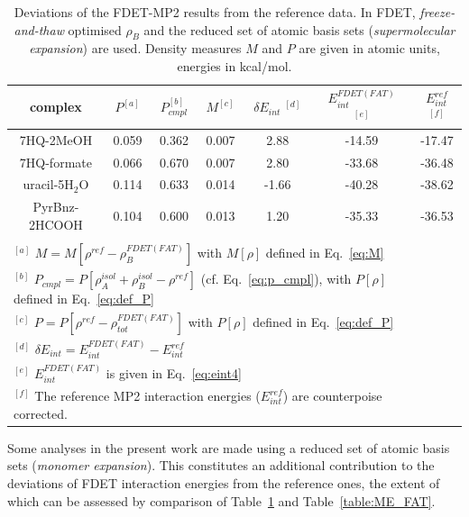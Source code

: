 \documentclass[amsmath,amssymb,preprint,aip,jcp]{revtex4-1}
\begin{document}
\begin{table}
{
\begin{center}
\begin{tabular}{|c|c|c|c|c|c|c|}
\hline
 complex & $P^{[a]}$ & $P_{cmpl}^{[b]}$ & $M^{[c]}$ & $\delta E_{int}\;^{[d]}$ & $E^{FDET(FAT)}_{int}$ $^{[e]}$ & $E_{int}^{ref}$ $^{[f]}$ \\ \hline
7HQ-2MeOH & 0.059 & 0.362 & 0.007 & 2.88 & -14.59 & -17.47 \\ \hline
7HQ-formate & 0.066 & 0.670 & 0.007 & 2.80 & -33.68 & -36.48 \\ \hline
uracil-5H$_2$O & 0.114 & 0.633 & 0.014 & -1.66 & -40.28 & -38.62 \\ \hline
PyrBnz-2HCOOH & 0.104 & 0.600 & 0.013 & 1.20 & -35.33 & -36.53 \\ \hline
\multicolumn{6}{c}{ } \\
\multicolumn{6}{l}{$^{[a]}$ $M=M[\rho^{ref} - \rho^{FDET(FAT)}_{B}]$ with $M[\rho]$ defined in Eq.~\ref{eq:M}}\\
\multicolumn{6}{l}{$^{[b]}$ $P_{cmpl}=P[\rho_A^{isol}+\rho_B^{isol} - \rho^{ref}]$ (cf. Eq.~\ref{eq:p_cmpl}), with $P[\rho]$ defined in Eq.~\ref{eq:def_P}}\\
\multicolumn{6}{l}{$^{[c]}$ $P=P[\rho^{ref} - \rho_{tot}^{FDET(FAT)}]$ with $P[\rho]$ defined in Eq.~\ref{eq:def_P}}\\
\multicolumn{6}{l}{$^{[d]}$ $\delta E_{int}=E^{FDET(FAT)}_{int}-E_{int}^{ref}$} \\
\multicolumn{6}{l}{$^{[e]}$ $E^{FDET(FAT)}_{int}$ is given in Eq.~\ref{eq:eint4}}\\
\multicolumn{6}{l}{$^{[f]}$ The reference MP2 interaction energies ($E_{int}^{ref}$) are counterpoise corrected.}
\end{tabular}
\end{center}
}%
\caption{Deviations of the FDET-MP2 results from the reference data. In FDET, \textit{freeze-and-thaw} optimised $\rho_B$ and the reduced set of atomic basis sets ({\it supermolecular expansion}) are used. 
Density measures $M$ and $P$ are given in atomic units, energies in kcal/mol.
}
\label{table:SE_FAT}
\end{table}

Some analyses in the present work are made using a reduced set of atomic basis sets ({\it monomer expansion}). This constitutes an additional contribution to the deviations of FDET interaction energies from the reference ones, the extent of which can be assessed by comparison of Table~\ref{table:SE_FAT} and Table~\ref{table:ME_FAT}.
\end{document}
